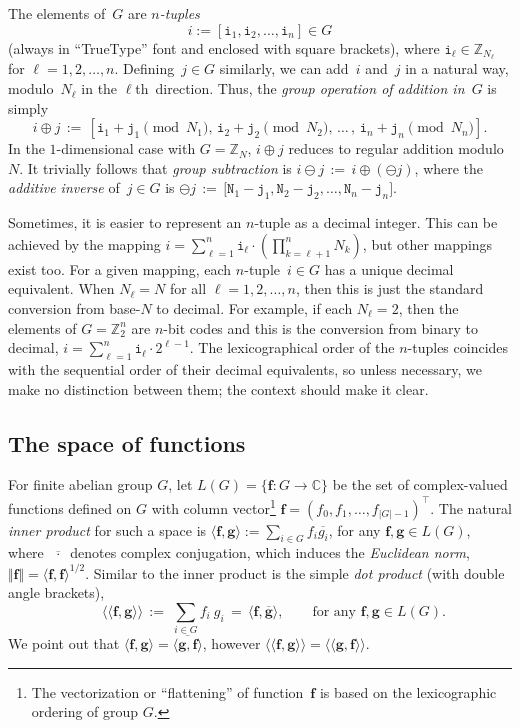 \documentclass[letterpaper,11pt]{article}
\newcommand{\bs}[1]{{\boldsymbol{#1}}}
\newcommand{\gr}[1]{( #1 )}
\newcommand{\AutoGroup}[1]{\left( #1 \right)}
\newcommand{\abs}[1]{\vert #1 \vert}
\newcommand{\set}[1]{\{ #1 \}}
\newcommand{\vect}[1]{[ #1 ]}
\newcommand{\Vect}[1]{\big[ #1 \big]}
\newcommand{\C}{\mathbb C}
\newcommand{\Int}{\mathbb Z}
\newcommand{\bcode}[1]{\texttt{#1}}
\newcommand{\norm}[1]{\Vert #1 \Vert}
\newcommand{\ip}[2]{\langle #1, #2 \rangle}
\newcommand{\dotprod}[2]{\langle\!\langle #1, #2 \rangle\!\rangle}
\newcommand{\ellth}{$\ell$th}
\theoremstyle{definition} \newtheorem{remark}{Remark}
\begin{document}
The elements of~$G$ are \emph{$n$-tuples}
\begin{equation} \label{Eq:i_n-tuple}
i := \vect{\bcode{i}_1, \bcode{i}_2, \ldots, \bcode{i}_n} \in G
\end{equation}
(always in ``TrueType'' font and enclosed with square brackets), where $\bcode{i}_\ell\in\Int_{N_\ell}$ for $\ell=1,2,\ldots,n$. Defining~$j\in G$ similarly, we can add~$i$ and~$j$ in a natural way, modulo~$N_\ell$ in the \ellth\ direction. Thus, the \emph{group operation of addition in~$G$} is simply
$$
i \oplus j \,:=\, \vect{\bcode{i}_1+\bcode{j}_1 \!\!\!\!\pmod{N_1},\, \bcode{i}_2+\bcode{j}_2 \!\!\!\!\pmod{N_2},\, \ldots\, , \, \bcode{i}_n+\bcode{j}_n \!\!\!\!\pmod{N_n}}.
$$
In the $1$-dimensional case with $G = \Int_N$, $i \oplus j$ reduces to regular addition modulo~$N$.
It trivially follows that \emph{group subtraction} is
$i \ominus j \,:=\, i \oplus \gr{\ominus j}$, where the \emph{additive inverse} of~$j\in G$ is
$\ominus j \,:=\, \Vect{\bcode{N}_1-\bcode{j}_1, \bcode{N}_2-\bcode{j}_2, \ldots, \bcode{N}_n-\bcode{j}_n}$.

Sometimes, it is easier to represent an $n$-tuple as a decimal integer. This can be achieved by the mapping $i = \sum_{\ell=1}^n \bcode{i}_\ell \cdot \AutoGroup{\prod_{k=\ell+1}^n N_k}$, but other mappings exist too. For a given mapping, each $n$-tuple~$i\in G$ has a unique decimal equivalent. When $N_\ell=N$ for all $\ell=1,2,\ldots,n$, then this is just the standard conversion from base-$N$ to decimal. For example, if each $N_\ell=2$, then the elements of $G=\Int_2^n$ are $n$-bit codes and this is the conversion from binary to decimal, $i = \sum_{\ell=1}^n \bcode{i}_\ell \cdot 2^{\ell-1}$.
The lexicographical order of the $n$-tuples coincides with the sequential order of their decimal equivalents, so unless necessary, we make no distinction between them; the context should make it clear.


\subsection{The space of functions} \label{Sec:Space_of_functions}
For finite abelian group $G$, let $L\gr{G}=\set{\bs{f}:G\rightarrow\C}$ be the set of complex-valued functions defined on $G$ with column vector\footnote{The vectorization or ``flattening'' of function~$\bs{f}$ is based on the lexicographic ordering of group $G$.} $\bs{f} = \gr{f_0,f_1,\ldots,f_{\abs{G}-1}}^\top$. The natural \emph{inner product} for such a space is $\ip{\bs{f}}{\bs{g}} := \sum_{i\in G} f_i \overline{g_i}$, for any $\bs{f},\bs{g}\in L\gr{G}$, where~$\overline{\:\cdot\:}$ denotes complex conjugation, which induces the \emph{Euclidean norm}, $\norm{\bs{f}}=\ip{\bs{f}}{\bs{f}}^{{1}/{2}}$. Similar to the inner product is the simple \emph{dot product} (with double angle brackets),
\begin{equation} \label{Def:dotProduct}
\qquad\dotprod{\bs{f}}{\bs{g}} \,:=\; \sum_{i\in G} f_i \:\! g_i \,=\, \ip{\bs{f}}{\overline{\bs{g}}}, \qquad \text{for any } \bs{f},\bs{g}\in L\gr{G}.
\end{equation}
We point out that $\ip{\bs{f}}{\bs{g}} = \overline{\ip{\bs{g}}{\bs{f}}}$, however $\dotprod{\bs{f}}{\bs{g}} = \dotprod{\bs{g}}{\bs{f}}$.
\end{document}

